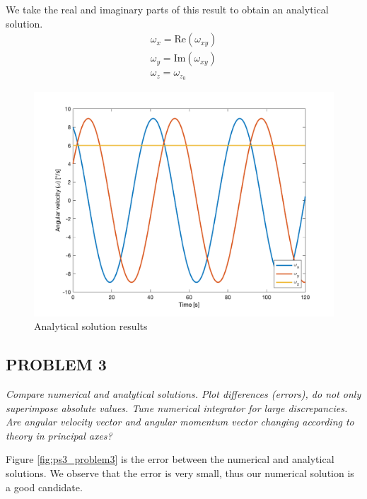 We take the real and imaginary parts of this result to obtain an analytical solution.
\begin{align*}
    \omega_x = \text{Re}(\omega_{xy}) \\
    \omega_y = \text{Im}(\omega_{xy}) \\ 
    \omega_z = \omega_{z_{0}}
\end{align*}


\begin{figure}[H]
\centering
\includegraphics[scale=0.6]{Images/ps3_problem2.png}
\caption{Analytical solution results}
\label{fig:ps3_problem2}
\end{figure}


\subsection{PROBLEM 3}
\textit{Compare numerical and analytical solutions. Plot differences (errors), do not only superimpose absolute values. Tune numerical integrator for large discrepancies. Are angular velocity vector and angular momentum vector changing according to theory in principal axes?}

Figure \ref{fig:ps3_problem3} is the error between the numerical and analytical solutions. We observe that the error is very small, thus our numerical solution is a good candidate.

